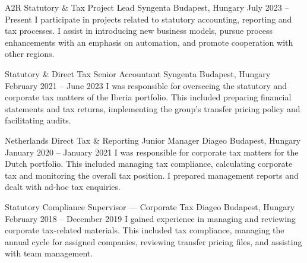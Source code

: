 


\begin{cventries}


  \cventry
    {A2R Statutory \& Tax Project Lead} %
    {Syngenta} %
    {Budapest, Hungary} %
    {July 2023 -- Present} %
    {} %
    {I participate in projects related to statutory accounting, reporting and tax processes. I assist in introducing new business models, pursue process enhancements with an emphasis on automation, and promote cooperation with other regions.} %


  \cventry
    {Statutory \& Direct Tax Senior Accountant} %
    {Syngenta} %
    {Budapest, Hungary} %
    {February 2021 -- June 2023} %
    {} %
    {I was responsible for overseeing the statutory and corporate tax matters of the Iberia portfolio. This included preparing financial statements and tax returns, implementing the group's transfer pricing policy and facilitating audits.} %


  \cventry
    {Netherlands Direct Tax \& Reporting Junior Manager} %
    {Diageo} %
    {Budapest, Hungary} %
    {January 2020 -- January 2021} %
    {} %
    {I was responsible for corporate tax matters for the Dutch portfolio. This included managing tax compliance, calculating corporate tax and monitoring the overall tax position. I prepared management reports and dealt with ad-hoc tax enquiries.} %


  \cventry
    {Statutory Compliance Supervisor — Corporate Tax} %
    {Diageo} %
    {Budapest, Hungary} %
    {February 2018 -- December 2019} %
    {} %
    {I gained experience in managing and reviewing corporate tax-related materials. This included tax compliance, managing the annual cycle for assigned companies, reviewing transfer pricing files, and assisting with team management.} %


\end{cventries}
